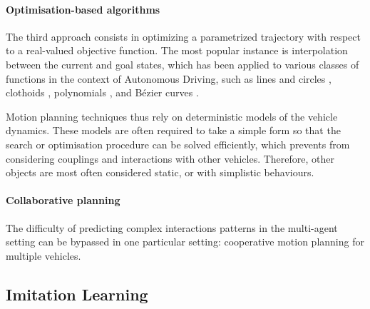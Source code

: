 \paragraph{Optimisation-based algorithms}

The third approach consists in optimizing a parametrized trajectory with respect to a real-valued objective function. The most popular instance is interpolation between the current and goal states, which has been applied to various classes of functions in the context of Autonomous Driving, such as lines and circles \citep{Reeds1990}, clothoids \citep{Funke2012}, polynomials \citep{Xu2012}, and Bézier curves \citep{Gonzalez2016}.

Motion planning techniques thus rely on deterministic models of the vehicle dynamics. These models are often required to take a simple form so that the search or optimisation procedure can be solved efficiently, which prevents from considering couplings and interactions with other vehicles. Therefore, other objects are most often considered static, or with simplistic behaviours. 

\paragraph{Collaborative planning}

The difficulty of predicting complex interactions patterns in the multi-agent setting can be bypassed in one particular setting: cooperative motion planning for multiple vehicles.


\subsection{Imitation Learning}

